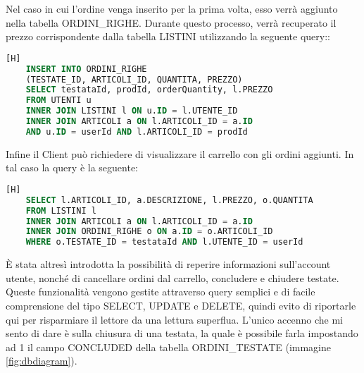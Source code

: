\noindent
Nel caso in cui l'ordine venga inserito per la prima volta, esso verrà aggiunto nella tabella ORDINI\_RIGHE. Durante questo processo, verrà recuperato il prezzo corrispondente dalla tabella LISTINI utilizzando la seguente query::
\begin{lstlisting}[language=sql, firstnumber=1] [H]
	INSERT INTO ORDINI_RIGHE 
	(TESTATE_ID, ARTICOLI_ID, QUANTITA, PREZZO)
	SELECT testataId, prodId, orderQuantity, l.PREZZO 
	FROM UTENTI u
	INNER JOIN LISTINI l ON u.ID = l.UTENTE_ID
	INNER JOIN ARTICOLI a ON l.ARTICOLI_ID = a.ID 
	AND u.ID = userId AND l.ARTICOLI_ID = prodId
\end{lstlisting}

\noindent
Infine il Client può richiedere di visualizzare il carrello con gli ordini aggiunti. In tal caso la query è la seguente:
\begin{lstlisting}[language=sql, firstnumber=1] [H]
	SELECT l.ARTICOLI_ID, a.DESCRIZIONE, l.PREZZO, o.QUANTITA
	FROM LISTINI l
	INNER JOIN ARTICOLI a ON l.ARTICOLI_ID = a.ID
	INNER JOIN ORDINI_RIGHE o ON a.ID = o.ARTICOLI_ID 
	WHERE o.TESTATE_ID = testataId AND l.UTENTE_ID = userId
\end{lstlisting}

\noindent
È stata altresì introdotta la possibilità di reperire informazioni sull'account utente, nonché di cancellare ordini dal carrello, concludere e chiudere testate. Queste funzionalità vengono gestite attraverso query semplici e di facile comprensione del tipo SELECT, UPDATE e DELETE, quindi evito di riportarle qui per risparmiare il lettore da una lettura superflua. L'unico accenno che mi sento di dare è sulla chiusura di una testata, la quale è possibile farla impostando ad 1 il campo CONCLUDED della tabella ORDINI\_TESTATE (immagine \ref{fig:dbdiagram}).

